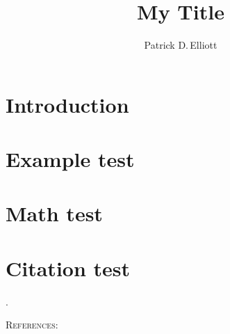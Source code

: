 \documentclass{ling-abstract}
\title{My Title}
\author{Patrick D.\,Elliott}
\begin{document}
\section{Introduction} \kant[1-2]

\section{Example test} \kant[3]

\kant[4]

\section{Math test} \kant[5]

\kant[6]

\section{Citation test}

\citet{heimThesis,heim1994,heim1997,heim_presupposition_1992}.

\noindent \textsc{References:}\printbibliography[heading=none]
\end{document}
